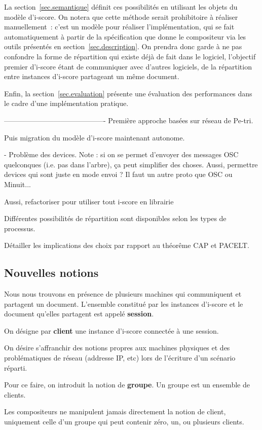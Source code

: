 \documentclass{article}
\newcommand\vocab[1]{\textbf{#1}}
\begin{document}
La section~\ref{sec.semantique} définit ces possibilités en utilisant les objets du modèle d'i-score. 
On notera que cette méthode serait prohibitoire à réaliser manuellement~: c'est un modèle pour réaliser l'implémentation, qui se fait automatiquement à partir de la spécification que donne le compositeur via les outils présentés en section~\ref{sec.description}. 
On prendra donc garde à ne pas confondre la forme de répartition qui existe déjà de fait dans le logiciel, l'objectif premier d'i-score étant de communiquer avec d'autres logiciels, de la répartition entre instances d'i-score partageant un même document.

Enfin, la section~\ref{sec.evaluation} présente une évaluation des performances dans le cadre 
d'une implémentation pratique.

-------------------------------------------
Première approche basées sur réseau de Pe-tri.

Puis migration du modèle d'i-score maintenant autonome.


- Problème des devices. Note : si on se permet d'envoyer des messages OSC quelconques (i.e. pas dans l'arbre), ça peut simplifier des choses. Aussi, permettre devices qui sont juste en mode envoi ? Il faut un autre proto que OSC ou Minuit...

Aussi, refactoriser pour utiliser tout i-score en librairie

Différentes possibilités de répartition sont disponibles selon les types de processus.

Détailler les implications des choix par rapport au théorême CAP et PACELT.

\subsection{Nouvelles notions}
Nous nous trouvons en présence de plusieurs machines qui communiquent et partagent un document.
L'ensemble constitué par les instances d'i-score et le document qu'elles partagent est appelé \vocab{session}.

On désigne par \vocab{client} une instance d'i-score connectée à une session.

On désire s'affranchir des notions propres aux machines physiques et des problématiques de réseau (addresse IP, etc) lors de l'écriture 
d'un scénario réparti. 

Pour ce faire, on introduit la notion de \vocab{groupe}. 
Un groupe est un ensemble de clients.

Les compositeurs ne manipulent jamais directement la notion de client, uniquement celle d'un groupe qui peut contenir zéro, un, ou plusieurs clients.
\end{document}
